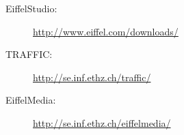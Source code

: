 \begin{description}
  \item[EiffelStudio:] \url{http://www.eiffel.com/downloads/}
  \item[TRAFFIC:] \url{http://se.inf.ethz.ch/traffic/}
  \item[EiffelMedia:] \url{http://se.inf.ethz.ch/eiffelmedia/}
\end{description}
